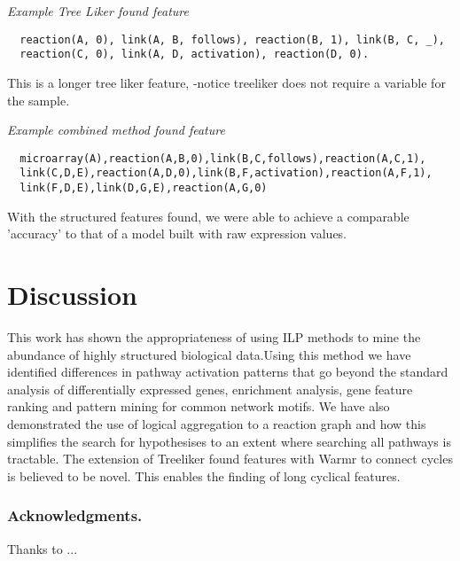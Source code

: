 \documentclass[runningheads,a4paper]{llncs}
\begin{document}
\noindent
{\it{Example Tree Liker found feature}}

\begin{verbatim}
  reaction(A, 0), link(A, B, follows), reaction(B, 1), link(B, C, _),    
  reaction(C, 0), link(A, D, activation), reaction(D, 0).
\end{verbatim}
\noindent 
This is a longer tree liker feature, -notice treeliker does not require a variable for the sample.  
\newline

\noindent
{\it{Example combined method found feature}}
\begin{verbatim}
  microarray(A),reaction(A,B,0),link(B,C,follows),reaction(A,C,1),
  link(C,D,E),reaction(A,D,0),link(B,F,activation),reaction(A,F,1),
  link(F,D,E),link(D,G,E),reaction(A,G,0)
\end{verbatim}
\noindent
With the structured features found, we were able to achieve a comparable 'accuracy' to that of a model built with raw expression values. 

\section{Discussion}
This work has shown the appropriateness of using ILP methods to mine the abundance of highly structured biological data.Using this method we have identified differences in pathway activation patterns that go beyond the standard analysis of differentially expressed genes, enrichment analysis, gene feature ranking and pattern mining for common network motifs. We have also demonstrated the use of logical aggregation to a  reaction graph and how this simplifies the search for hypothesises to an extent where searching all pathways is tractable. The extension of Treeliker found features with Warmr to connect cycles is believed to be novel. This enables the finding of long cyclical features. 



\subsubsection*{Acknowledgments.} Thanks to ...
\newline
\newline

\begingroup
\let\clearpage\relax
{}
\endgroup

%

%
%
\end{document}
